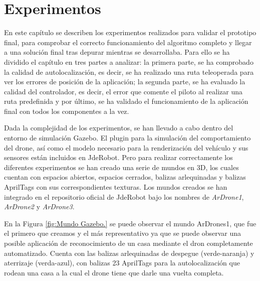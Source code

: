 \chapter{Experimentos}\label{cap.experimentos}
\hspace{1cm} En este capítulo se describen los experimentos realizados para validar el prototipo final, para comprobar el correcto funcionamiento del algoritmo completo y llegar a una solución final tras depurar mientras se desarrollaba. Para ello se ha dividido el capítulo en tres partes a analizar: la primera parte, se ha comprobado la calidad de autolocalización, es decir, se ha realizado una ruta teleoperada para ver los errores de posición de la aplicación; la segunda parte, se ha evaluado la calidad del controlador, es decir, el error que comente el piloto al realizar una ruta predefinida y por último, se ha validado el funcionamiento de la aplicación final con todos los componentes a la vez.

\hspace{1cm} Dada la complejidad de los experimentos, se han llevado a cabo dentro del entorno de simulación Gazebo. El plugin para la simulación del comportamiento del drone, así como el modelo necesario para la renderización del vehículo y sus sensores están incluidos en JdeRobot. Pero para realizar correctamente los diferentes experimentos se han creado una serie de mundos en 3D, los cuales cuentan con espacios abiertos, espacios cerrados, balizas arlequinadas y balizas AprilTags con sus correspondientes texturas. Los mundos creados se han integrado en el repositorio oficial de JdeRobot bajo los nombres de \textit{ArDrone1}, \textit{ArDrone2} y \textit{ArDrone3}.

\hspace{1cm} En la Figura \ref{fig:Mundo Gazebo.} se puede observar el mundo ArDrones1, que fue el primero que creamos y el más representativo ya que se puede observar una posible aplicación de reconocimiento de un casa mediante el dron completamente automatizado. Cuenta con las balizas arlequinadas de despegue (verde-naranja) y aterrizaje (verda-azul), con balizas 23 AprilTags para la autolocalización que rodean una casa a la cual el drone tiene que darle una vuelta completa.

